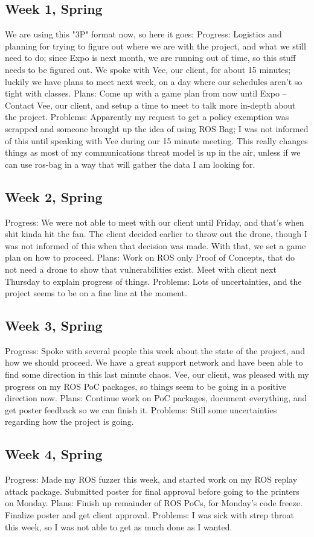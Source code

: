 \subsection{Week 1, Spring}
We are using this "3P" format now, so here it goes:
Progress: Logistics and planning for trying to figure out where we are with the project, and what we still need to do; since Expo is next month, we are running out of time, so this stuff needs to be figured out. We spoke with Vee, our client, for about 15 minutes; luckily we have plans to meet next week, on a day where our schedules aren't so tight with classes.
Plans: Come up with a game plan from now until Expo -- Contact Vee, our client, and setup a time to meet to talk more in-depth about the project.
Problems: Apparently my request to get a policy exemption was scrapped and someone brought up the idea of using ROS Bag; I was not informed of this until speaking with Vee during our 15 minute meeting. This really changes things as most of my communications threat model is up in the air, unless if we can use ros-bag in a way that will gather the data I am looking for.
\subsection{Week 2, Spring}
Progress: We were not able to meet with our client until Friday, and that's when shit kinda hit the fan. The client decided earlier to throw out the drone, though I was not informed of this when that decision was made. With that, we set a game plan on how to proceed.
Plans: Work on ROS only Proof of Concepts, that do not need a drone to show that vulnerabilities exist. Meet with client next Thursday to explain progress of things.
Problems: Lots of uncertainties, and the project seems to be on a fine line at the moment.
\subsection{Week 3, Spring}
Progress: Spoke with several people this week about the state of the project, and how we should proceed. We have a great support network and have been able to find some direction in this last minute chaos. Vee, our client, was pleased with my progress on my ROS PoC packages, so things seem to be going in a positive direction now.
Plans: Continue work on PoC packages, document everything, and get poster feedback so we can finish it.
Problems: Still some uncertainties regarding how the project is going.
\subsection{Week 4, Spring}
Progress: Made my ROS fuzzer this week, and started work on my ROS replay attack package. Submitted poster for final approval before going to the printers on Monday.
Plans: Finish up remainder of ROS PoCs, for Monday's code freeze. Finalize poster and get client approval.
Problems: I was sick with strep throat this week, so I was not able to get as much done as I wanted.
